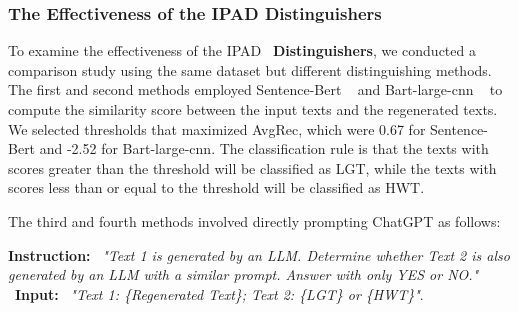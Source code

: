 \begin{table}[htbp]
\centering
{}
\caption{Comparison of the IPAD \textbf{Prompt Inverter} with other prompt extractors}
\label{tab:model_comparison}
\end{table}
\vspace{-0.3cm}


\subsubsection{The Effectiveness of the IPAD Distinguishers}

To examine the effectiveness of the IPAD ~\textbf{Distinguishers}, we conducted a comparison study using the same dataset but different distinguishing methods. The first and second methods employed Sentence-Bert ~\cite{r63} and Bart-large-cnn ~\cite{r64} to compute the similarity score between the input texts and the regenerated texts. We selected thresholds that maximized AvgRec, which were 0.67 for Sentence-Bert and -2.52 for Bart-large-cnn. The classification rule is that the texts with scores greater than the threshold will be classified as LGT, while the texts with scores less than or equal to the threshold will be classified as HWT.

The third and fourth methods involved directly prompting ChatGPT as follows: 

\textbf{Instruction:} ~\textit{"Text 1 is generated by an LLM. Determine whether Text 2 is also generated by an LLM with a similar prompt. Answer with only YES or NO."}  ~\textbf{Input: }~\textit{"Text 1: \{Regenerated Text\}; Text 2: \{LGT\} or \{HWT\}"}. 

